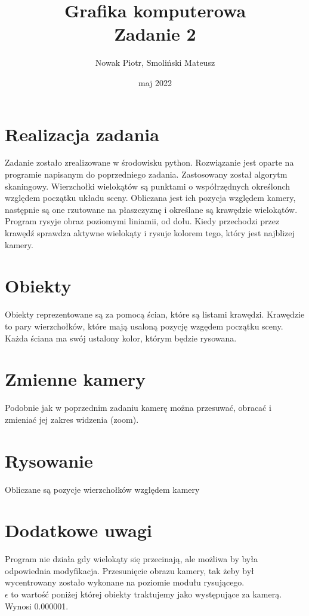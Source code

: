 \documentclass[a4paper,11pt]{article}
\title{Grafika komputerowa \\
{Zadanie 2}}
\author{Nowak Piotr, Smoliński Mateusz}
\date{maj 2022}
\begin{document}
\maketitle

\section{Realizacja zadania}
Zadanie zostało zrealizowane w środowisku python. Rozwiązanie 
jest oparte na programie napisanym do poprzedniego zadania. 
Zastosowany został algorytm skaningowy. Wierzchołki wielokątów
są punktami o współrzędnych określonch względem początku układu 
sceny. Obliczana jest ich pozycja względem kamery, następnie są 
one rzutowane na płaszczyznę i określane są krawędzie wielokątów. 
Program rysyje obraz poziomymi liniamii, od dołu. Kiedy przechodzi
przez krawędź sprawdza aktywne wielokąty i rysuje kolorem tego, 
który jest najblizej kamery.

\section{Obiekty}
Obiekty reprezentowane są za pomocą ścian, które są listami 
krawędzi. Krawędzie to pary wierzchołków, które mają usaloną 
pozycję wzgędem początku sceny. Każda ściana ma swój ustalony 
kolor, którym będzie rysowana.

\section{Zmienne kamery}
Podobnie jak w poprzednim zadaniu kamerę można przesuwać, 
obracać i zmieniać jej zakres widzenia (zoom).

\section{Rysowanie}
Obliczane są pozycje wierzchołków względem kamery

\section{Dodatkowe uwagi}
Program nie działa gdy wielokąty się przecinają, ale możliwa by 
była odpowiednia modyfikacja.
Przesunięcie obrazu kamery, tak żeby był wycentrowany zostało 
wykonane na poziomie modułu rysującego. \\
\(\epsilon\) to wartość poniżej której obiekty traktujemy jako 
występujące za kamerą. Wynosi 0.000001. 
\end{document}
